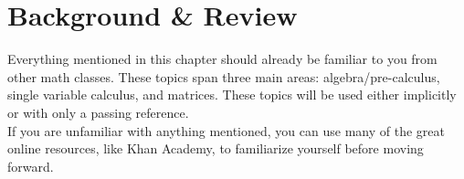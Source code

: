 \chapter{Background \& Review}
\noindent 
Everything mentioned in this chapter should already be familiar to you from other math classes. These topics span three main areas: algebra/pre-calculus, single variable calculus, and matrices. These topics will be used either implicitly or with only a passing reference.\\

\noindent
If you are unfamiliar with anything mentioned, you can use many of the great online resources, like Khan Academy, to familiarize yourself before moving forward.

